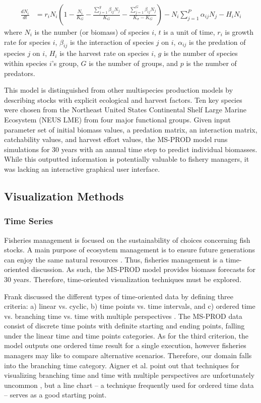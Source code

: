 \documentclass{article}
\begin{document}
\begin{align}
\frac{d N_i}{dt} &= r_i N_i \left(1 - \frac{N_i}{K_G} - \frac{\displaystyle\sum\limits_{j=1}^g \beta_{ij} N_j}{K_G} - \frac{\displaystyle\sum\limits_{j=1}^G \beta_{ij} N_j}{K_{\sigma} - K_G}\right) - N_i \displaystyle\sum\limits_{j=1}^P \alpha_{ij} N_j - H_i N_i
\end{align}
where $N_i$ is the number (or biomass) of species $i$, $t$ is a unit of time, $r_i$ is growth rate for species $i$, $\beta_{ij}$ is the interaction of species $j$ on $i$, $\alpha_{ij}$ is the predation of species $j$ on $i$, $H_i$ is the harvest rate on species $i$, $g$ is the number of species within species $i$'s group, $G$ is the number of groups, and $p$ is the number of predators.

This model is distinguished from other multispecies production models by describing stocks with explicit ecological and harvest factors.  Ten key species were chosen from the Northeast United States Continental Shelf Large Marine Ecosystem (NEUS LME) from four major functional groups.  Given input parameter set of initial biomass values, a predation matrix, an interaction matrix, catchability values, and harvest effort values, the MS-PROD model runs simulations for 30 years with an annual time step to predict individual biomasses.  While this outputted information is potentially valuable to fishery managers, it was lacking an interactive graphical user interface.  

\subsection{Visualization Methods}

\subsubsection{Time Series}

Fisheries management is focused on the sustainability of choices concerning fish stocks.  A main purpose of ecosystem management is to ensure future generations can enjoy the same natural resources \cite{Christensen1996Report}.  Thus, fisheries management is a time-oriented discussion.  As such, the MS-PROD model provides biomass forecasts for 30 years.  Therefore, time-oriented visualization techniques must be explored.

Frank discussed the different types of time-oriented data by defining three criteria: a) linear vs. cyclic, b) time points vs. time intervals, and c) ordered time vs. branching time vs. time with multiple perspectives \cite{frank98times}.  The MS-PROD data consist of discrete time points with definite starting and ending points, falling under the linear time and time points categories.  As for the third criterion, the model outputs one ordered time result for a single execution, however fisheries managers may like to compare alternative scenarios.  Therefore, our domain falls into the branching time category.  Aigner et al. point out that techniques for visualizing branching time and time with multiple perspectives are unfortunately uncommon \cite{Aigner08visualmethods}, but a line chart -- a technique frequently used for ordered time data -- serves as a good starting point.
\end{document}
